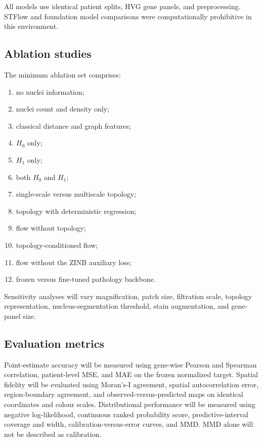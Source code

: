 \documentclass[nocrop]{bioinfo}
\begin{document}
All models use identical patient splits, HVG gene panels, and preprocessing. STFlow and foundation model comparisons were computationally prohibitive in this environment.

\subsection{Ablation studies}

The minimum ablation set comprises:

\begin{enumerate}
\item no nuclei information;
\item nuclei count and density only;
\item classical distance and graph features;
\item $H_0$ only;
\item $H_1$ only;
\item both $H_0$ and $H_1$;
\item single-scale versus multiscale topology;
\item topology with deterministic regression;
\item flow without topology;
\item topology-conditioned flow;
\item flow without the ZINB auxiliary loss;
\item frozen versus fine-tuned pathology backbone.
\end{enumerate}

Sensitivity analyses will vary magnification, patch size, filtration scale,
topology representation, nucleus-segmentation threshold, stain augmentation,
and gene-panel size.

\subsection{Evaluation metrics}

Point-estimate accuracy will be measured using gene-wise Pearson and Spearman
correlation, patient-level MSE, and MAE on the frozen normalized target.
Spatial fidelity will be evaluated using Moran's-I agreement, spatial
autocorrelation error, region-boundary agreement, and
observed-versus-predicted maps on identical coordinates and colour scales.
Distributional performance will be measured using negative log-likelihood,
continuous ranked probability score, predictive-interval coverage and width,
calibration-versus-error curves, and MMD. MMD alone will not be described as
calibration.
\end{document}
